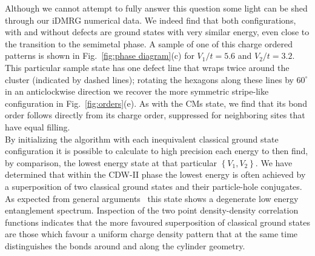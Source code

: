 \documentclass[aps,prx,10pt,twocolumn,floatfix,superscriptaddress,showpacs,numerical,footinbib]{revtex4-1}
\begin{document}
Although we cannot attempt to fully answer this question some light can be shed through our iDMRG numerical data. 
%
We indeed find that both configurations, with and without defects are ground states with very similar energy,
even close to the transition to the semimetal phase.
%
A sample of one of this charge ordered patterns is shown in Fig.~\ref{fig:phase diagram}(c) for $V_{1}/t=5.6$ and $V_{2}/t=3.2$.
%
This particular sample state has one defect line that wraps twice around the cluster (indicated by dashed lines); rotating the hexagons along these
lines by $60^{\circ}$ in an anticlockwise direction we recover the more symmetric stripe-like configuration in Fig.~\ref{fig:orders}(e).
%
As with the CMs state, we find that its bond order follows directly from its charge order, suppressed for neighboring sites that have
equal filling.\\
%
By initializing the algorithm with each inequivalent classical ground state configuration it is possible to calculate to high precision each 
energy to then find, by comparison, the lowest energy state at that particular $\left\lbrace V_{1},V_{2}\right\rbrace$.
%
We have determined that within the CDW-II phase the lowest energy is often achieved by a superposition of two classical ground states
and their particle-hole conjugates.
%
As expected from general arguments~\cite{KZM13} this state shows a degenerate low energy entanglement spectrum.
%
Inspection of the two point density-density correlation functions indicates that 
the more favoured superposition of classical ground states are those which favour a uniform charge density pattern that at the same time
distinguishes the bonds around and along the cylinder geometry.
%
\end{document}
